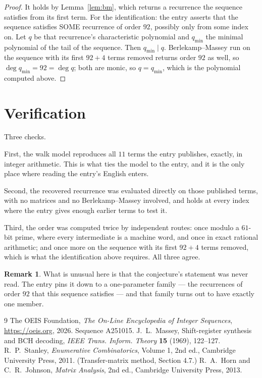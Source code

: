 \documentclass[11pt,a4paper]{article}
\theoremstyle{plain}
\theoremstyle{definition}
\newtheorem{remark}[theorem]{Remark}
\begin{document}
\begin{proof}
It holds by Lemma~\ref{lem:bm}, which returns a recurrence the sequence satisfies from its
first term. For the identification: the entry asserts that the sequence satisfies SOME
recurrence of order $92$, possibly only from some index on. Let $q$ be that recurrence's
characteristic polynomial and $q_{\min}$ the minimal polynomial of the tail of the sequence.
Then $q_{\min}\mid q$. Berlekamp--Massey run on the sequence with its first $92+4$ terms
removed returns order $92$ as well, so $\deg q_{\min}=92=\deg q$; both are monic, so
$q=q_{\min}$, which is the polynomial computed above.
\end{proof}

\section{Verification}

Three checks.

First, the walk model reproduces all $11$ terms the entry publishes, exactly, in integer
arithmetic. This is what ties the model to the entry, and it is the only place where reading
the entry's English enters.

Second, the recovered recurrence was evaluated directly on those published terms, with no
matrices and no Berlekamp--Massey involved, and holds at every index where the entry gives
enough earlier terms to test it.

Third, the order was computed twice by independent routes: once modulo a $61$-bit prime, where
every intermediate is a machine word, and once in exact rational arithmetic; and once more on
the sequence with its first $92+4$ terms removed, which is what the identification above
requires. All three agree.

\begin{remark}
What is unusual here is that the conjecture's statement was never read. The entry pins it down
to a one-parameter family --- the recurrences of order $92$ that this sequence satisfies
--- and that family turns out to have exactly one member.
\end{remark}

\begin{thebibliography}{9}
 The OEIS Foundation, \emph{The On-Line Encyclopedia of Integer
Sequences}, \url{https://oeis.org}, 2026. Sequence A251015.
 J.~L.~Massey, Shift-register synthesis and BCH decoding, \emph{IEEE
Trans. Inform. Theory} \textbf{15} (1969), 122--127.
 R.~P.~Stanley, \emph{Enumerative Combinatorics}, Volume 1, 2nd ed.,
Cambridge University Press, 2011. (Transfer-matrix method, Section 4.7.)
 R.~A.~Horn and C.~R.~Johnson, \emph{Matrix Analysis}, 2nd ed., Cambridge
University Press, 2013.
\end{thebibliography}
\end{document}
